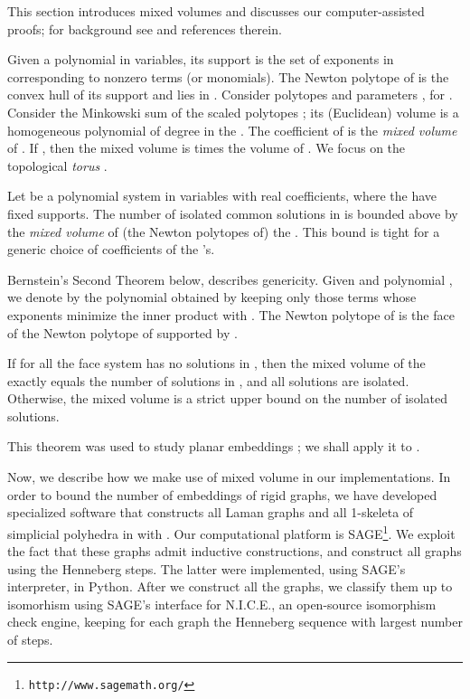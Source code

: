 \documentclass[envcountsame]{llncs}
\begin{document}
This section introduces mixed volumes and discusses our computer-assisted proofs;
for background see \cite{B75,EmCa95} and references therein.

Given a polynomial  in  variables, its support is the set of exponents
in  corresponding to nonzero terms (or monomials).
The Newton polytope of  is the convex hull of its support and lies in .
Consider polytopes  and parameters , for .
Consider the Minkowski sum of the scaled polytopes
;
its (Euclidean) volume is a homogeneous polynomial of degree  in the .
The coefficient of  is the
{\em mixed volume} of .
If , then the mixed volume is  times the volume of .
We focus on the topological {\em torus} .
 
\begin{theorem} {\rm \cite{B75}}
Let  be a polynomial system in  variables with real coefficients,
where the  have fixed supports.
  The number of isolated common solutions in  is bounded above 
  by the {\em mixed volume} of (the Newton polytopes of) the .
  This bound is tight for a generic choice of coefficients of the 's.
\end{theorem}

Bernstein's Second Theorem below, describes genericity.
Given  and polynomial , we denote by 
the polynomial obtained by keeping only those terms whose exponents minimize
the inner product with .
The Newton polytope of  is the face of the Newton polytope of 
supported by .

\begin{theorem}\label{Bernstein2nd} {\rm \cite{B75}}
  If for all  the face system
   has no solutions in ,
then the mixed volume of the  exactly equals the number of
solutions in , and all solutions are isolated.
Otherwise, the mixed volume is a strict upper bound on the number of isolated solutions.
\end{theorem}

This theorem was used to study planar embeddings \cite{ST08}; we shall apply it to .

Now, we describe how we make use of mixed volume in our implementations.
In order to bound the number of embeddings of rigid graphs, we have
developed specialized software that constructs all Laman graphs 
and all 1-skeleta of simplicial polyhedra in  with .
Our computational platform is SAGE\footnote{\texttt{http://www.sagemath.org/}}.
We exploit the fact that these graphs admit inductive constructions, and
construct all graphs using the  Henneberg steps.
The latter were implemented, using SAGE's interpreter, in Python. 
After we construct all the graphs, we classify them up to isomorhism 
using SAGE's interface for N.I.C.E., an open-source isomorphism check engine,
keeping for each graph the Henneberg sequence with largest number of  steps.
 
\end{document}
